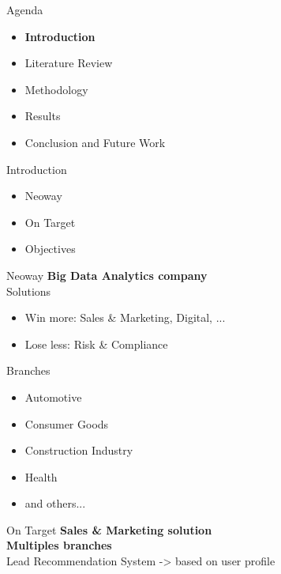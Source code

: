 \begin{frame}{Agenda}
\begin{itemize}
    \item \textbf{Introduction}
    \item Literature Review
    \item Methodology
    \item Results
    \item Conclusion and Future Work
\end{itemize}
\end{frame}


\begin{frame}{Introduction}
\begin{itemize}
    \item{Neoway\\}
    \vspace{0.5cm}
    \item{On Target\\}
    \vspace{0.5cm}
    \item{Objectives\\}
\end{itemize}
\end{frame}

%

\begin{frame}{Neoway}
\textbf{Big Data Analytics company\\} \pause
\vspace{0.5cm}
Solutions \pause
\begin{itemize}
    \item Win more: Sales \& Marketing, Digital, ... \pause
    \item Lose less: Risk \& Compliance \pause
\end{itemize}
\vspace{0.5cm}
Branches \pause
\begin{itemize}
    \item Automotive \pause
    \item Consumer Goods \pause
    \item Construction Industry \pause
    \item Health \pause
    \item and others...
\end{itemize} 
\end{frame}


\begin{frame}{On Target} \pause
    \textbf{Sales \& Marketing solution\\}  \pause
    \vspace{0.5cm}
    \textbf{Multiples branches \\}  \pause
    \vspace{0.5cm}
    Lead Recommendation System \pause
    -> based on user profile
    \vspace{0.5cm}
\end{frame}

